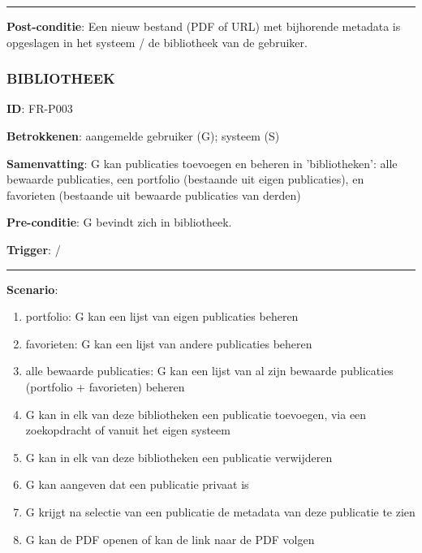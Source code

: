 \vspace{2 mm}
\hrule
\vspace{4 mm}


\noindent \textbf{Post-conditie}: Een nieuw bestand (PDF of URL) met bijhorende metadata is opgeslagen in het systeem / de bibliotheek van de gebruiker. \\


\subsubsection{BIBLIOTHEEK}
\vspace{2 mm}

\textbf{ID}: FR-P003
\vspace{2 mm}

\noindent \textbf{Betrokkenen}: aangemelde gebruiker (G); systeem (S) 
\vspace{2 mm}

\noindent \textbf{Samenvatting}: G kan publicaties toevoegen en beheren in 'bibliotheken': alle bewaarde publicaties, een portfolio (bestaande uit eigen publicaties), en favorieten (bestaande uit bewaarde publicaties van derden)
\vspace{2 mm}

\noindent \textbf{Pre-conditie}: G bevindt zich in bibliotheek. 
\vspace{2 mm}

\noindent \textbf{Trigger}: / 
\vspace{4 mm}

\hrule
\vspace{2 mm}
\noindent \textbf{Scenario}:
\begin{enumerate}
\item portfolio: G kan een lijst van eigen publicaties beheren 
\item favorieten: G kan een lijst van andere publicaties beheren 
\item alle bewaarde publicaties: G kan een lijst van al zijn bewaarde publicaties (portfolio + favorieten) beheren 
\item G kan in elk van deze bibliotheken een publicatie toevoegen, via een zoekopdracht of vanuit het eigen systeem 
\item G kan in elk van deze bibliotheken een publicatie verwijderen 
\item G kan aangeven dat een publicatie privaat is 
\item G krijgt na selectie van een publicatie de metadata van deze publicatie te zien
\item G kan de PDF openen of kan de link naar de PDF volgen 
\end{enumerate}


